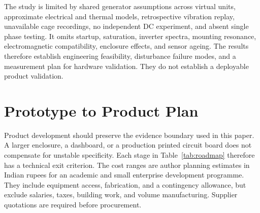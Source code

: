 \documentclass[10pt,twocolumn]{article}
\begin{document}
The study is limited by shared generator assumptions across virtual units, approximate electrical and thermal models, retrospective vibration replay, unavailable cage recordings, no independent DC experiment, and absent single phase testing. It omits startup, saturation, inverter spectra, mounting resonance, electromagnetic compatibility, enclosure effects, and sensor ageing. The results therefore establish engineering feasibility, disturbance failure modes, and a measurement plan for hardware validation. They do not establish a deployable product validation.

\section{Prototype to Product Plan}
\label{sec:product}
Product development should preserve the evidence boundary used in this paper. A larger enclosure, a dashboard, or a production printed circuit board does not compensate for unstable specificity. Each stage in Table~\ref{tab:roadmap} therefore has a technical exit criterion. The cost ranges are author planning estimates in Indian rupees for an academic and small enterprise development programme. They include equipment access, fabrication, and a contingency allowance, but exclude salaries, taxes, building work, and volume manufacturing. Supplier quotations are required before procurement.
\end{document}
